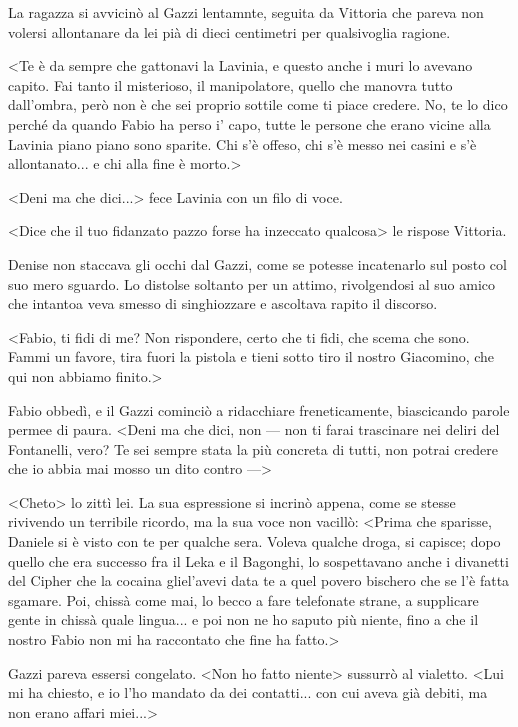 La ragazza si avvicinò al Gazzi lentamnte, seguita da Vittoria che pareva non volersi allontanare da lei pià di dieci centimetri per qualsivoglia ragione. 

<Te è da sempre che gattonavi la Lavinia, e questo anche i muri lo avevano capito. Fai tanto il misterioso, il manipolatore, quello che manovra tutto dall'ombra, però non è che sei proprio sottile come ti piace credere. No, te lo dico perché da quando Fabio ha perso i' capo, tutte le persone che erano vicine alla Lavinia piano piano sono sparite. Chi s'è offeso, chi s'è messo nei casini e s'è allontanato... e chi alla fine è morto.>

<Deni ma che dici...> fece Lavinia con un filo di voce.

<Dice che il tuo fidanzato pazzo forse ha inzeccato qualcosa> le rispose Vittoria. 

Denise non staccava gli occhi dal Gazzi, come se potesse incatenarlo sul posto col suo mero sguardo. Lo distolse soltanto per un attimo, rivolgendosi al suo amico che intantoa veva smesso di singhiozzare e ascoltava rapito il discorso.

<Fabio, ti fidi di me? Non rispondere, certo che ti fidi, che scema che sono. Fammi un favore, tira fuori la pistola e tieni sotto tiro il nostro Giacomino, che qui non abbiamo finito.>

Fabio obbedì, e il Gazzi cominciò a ridacchiare freneticamente, biascicando parole permee di paura. <Deni ma che dici, non --- non ti farai trascinare nei deliri del Fontanelli, vero? Te sei sempre stata la più concreta di tutti, non potrai credere che io abbia mai mosso un dito contro --->

<Cheto> lo zittì lei. La sua espressione si incrinò appena, come se stesse rivivendo un terribile ricordo, ma la sua voce non vacillò: <Prima che sparisse, Daniele si è visto con te per qualche sera. Voleva qualche droga, si capisce; dopo quello che era successo fra il Leka e il Bagonghi, lo sospettavano anche i divanetti del Cipher che la cocaina gliel'avevi data te a quel povero bischero che se l'è fatta sgamare. Poi, chissà come mai, lo becco a fare telefonate strane, a supplicare gente in chissà quale lingua... e poi non ne ho saputo più niente, fino a che il nostro Fabio non mi ha raccontato che fine ha fatto.>

Gazzi pareva essersi congelato. <Non ho fatto niente> sussurrò al vialetto. <Lui mi ha chiesto, e io l'ho mandato da dei contatti... con cui aveva già debiti, ma non erano affari miei...>


